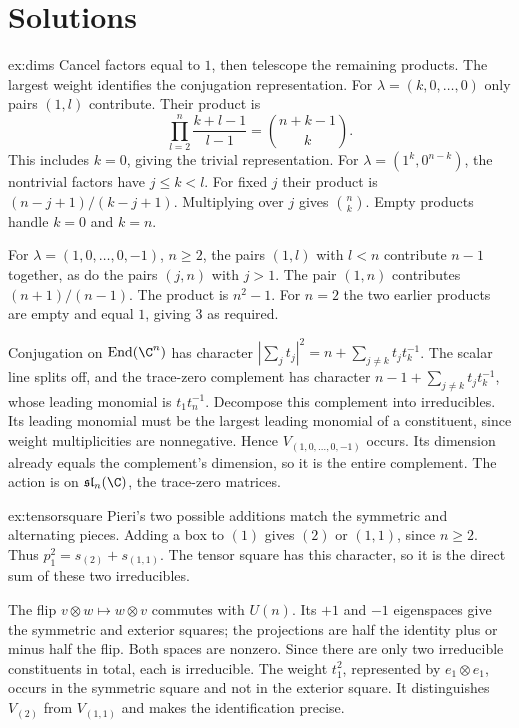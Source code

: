 \section{Solutions}

\begin{solution}{ex:dims}
\idea Cancel factors equal to $1$, then telescope the remaining products. The largest weight identifies the conjugation representation.
\writeup For $\lambda=(k,0,\ldots,0)$ only pairs $(1,l)$ contribute. Their product is
\[
\prod_{l=2}^n\frac{k+l-1}{l-1}=\binom{n+k-1}{k}.
\]
This includes $k=0$, giving the trivial representation. For $\lambda=(1^k,0^{n-k})$, the nontrivial factors have $j\le k<l$. For fixed $j$ their product is $(n-j+1)/(k-j+1)$. Multiplying over $j$ gives $\binom nk$. Empty products handle $k=0$ and $k=n$.

For $\lambda=(1,0,\ldots,0,-1)$, $n\ge2$, the pairs $(1,l)$ with $l<n$ contribute $n-1$ together, as do the pairs $(j,n)$ with $j>1$. The pair $(1,n)$ contributes $(n+1)/(n-1)$. The product is $n^2-1$. For $n=2$ the two earlier products are empty and equal $1$, giving $3$ as required.

Conjugation on $\operatorname{End}(\C^n)$ has character
$|\sum_jt_j|^2=n+\sum_{j\ne k}t_jt_k^{-1}$.
The scalar line splits off, and the trace-zero complement has character
$n-1+\sum_{j\ne k}t_jt_k^{-1}$, whose leading monomial is $t_1t_n^{-1}$. Decompose this complement into irreducibles. Its leading monomial must be the largest leading monomial of a constituent, since weight multiplicities are nonnegative. Hence $V_{(1,0,\ldots,0,-1)}$ occurs. Its dimension already equals the complement's dimension, so it is the entire complement. The action is on $\mathfrak{sl}_n(\C)$, the trace-zero matrices.
\end{solution}

\begin{solution}{ex:tensorsquare}
\idea Pieri's two possible additions match the symmetric and alternating pieces.
\writeup Adding a box to $(1)$ gives $(2)$ or $(1,1)$, since $n\ge2$. Thus $p_1^2=s_{(2)}+s_{(1,1)}$. The tensor square has this character, so it is the direct sum of these two irreducibles.

The flip $v\otimes w\mapsto w\otimes v$ commutes with $U(n)$. Its $+1$ and $-1$ eigenspaces give the symmetric and exterior squares; the projections are half the identity plus or minus half the flip. Both spaces are nonzero. Since there are only two irreducible constituents in total, each is irreducible. The weight $t_1^2$, represented by $e_1\otimes e_1$, occurs in the symmetric square and not in the exterior square. It distinguishes $V_{(2)}$ from $V_{(1,1)}$ and makes the identification precise.
\end{solution}

